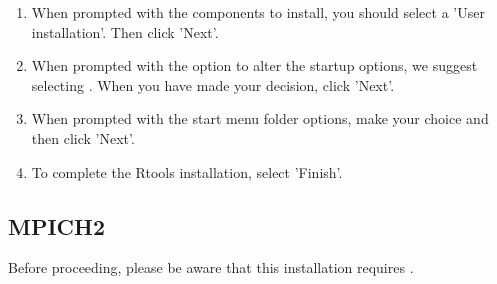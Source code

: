 \begin{enumerate}
  \item When prompted with the components to install, you should select a 'User installation'.  Then click 'Next'.
  \item When prompted with the option to alter the startup options, we suggest selecting .  When you have made your decision, click 'Next'.
  \item When prompted with the start menu folder options, make your choice and then click 'Next'.
  \item To complete the Rtools installation, select 'Finish'.
\end{enumerate}





\subsection{MPICH2}
Before proceeding, please be aware that this installation requires {\color{red}{administrative privileges}}.

